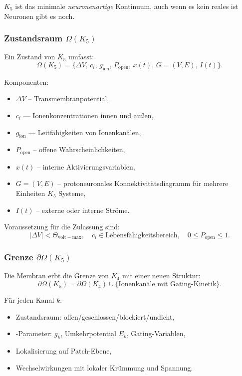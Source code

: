 $K_5$ ist das minimale \emph{neuronenartige} Kontinuum, auch wenn es kein reales ist
Neuronen gibt es noch.

\subsubsection{Zustandsraum \texorpdfstring{$\Omega(K_5)$}{\Omega(K_5)}}

Ein Zustand von $K_5$ umfasst:
\[
\Omega(K_5) = \{ \Delta V,\, c_i,\, g_{\mathrm{ion}},\,
                P_{\mathrm{open}},\,
                x(t),\,
                G=(V,E),\,
                I(t) \}.
\]

Komponenten:
\begin{itemize}
    \item $\Delta V$ – Transmembranpotential,
    \item $c_i$ — Ionenkonzentrationen innen und außen,
    \item $g_{\mathrm{ion}}$ — Leitfähigkeiten von Ionenkanälen,
    \item $P_{\mathrm{open}}$ – offene Wahrscheinlichkeiten,
    \item $x(t)$ – interne Aktivierungsvariablen,
    \item $G=(V,E)$ – protoneuronales Konnektivitätsdiagramm für mehrere Einheiten
          $K_5$ Systeme,
    \item $I(t)$ – externe oder interne Ströme.
\end{itemize}

Voraussetzung für die Zulassung sind:
\[
|\Delta V| < \Theta_{\mathrm{volt-max}}, \quad
c_i \in \text{Lebensfähigkeitsbereich}, \quad
0 \le P_{\mathrm{open}} \le 1.
\]

\subsubsection{Grenze \texorpdfstring{$\partial\Omega(K_5)$}{\partial\Omega(K_5)}}

Die Membran erbt die Grenze von $K_4$ mit einer neuen Struktur:
\[
\partial\Omega(K_5)
    = \partial\Omega(K_4)
      \cup \{ \text{Ionenkanäle mit Gating-Kinetik} \}.
\]

Für jeden Kanal $k$:
\begin{itemize}
    \item Zustandsraum: offen/geschlossen/blockiert/undicht,
    \item-Parameter: $g_k$, Umkehrpotential $E_k$, Gating-Variablen,
    \item Lokalisierung auf Patch-Ebene,
    \item Wechselwirkungen mit lokaler Krümmung und Spannung.
\end{itemize}

